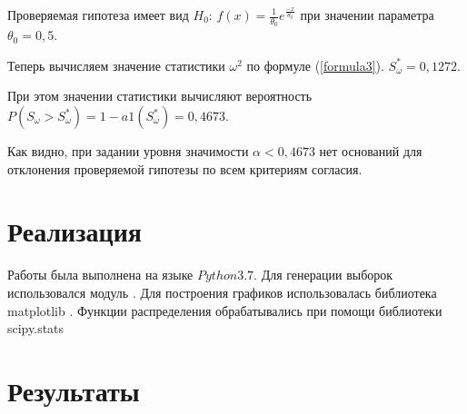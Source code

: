 \documentclass[a4]{article}
\begin{document}
Проверяемая гипотеза имеет вид $H_{0}$: $f(x) = \frac{1}{\theta_{0}}e^\frac{-x}{\theta_{0}}$ при значении параметра $\theta_{0} = 0,5$.

Теперь вычисляем значение статистики $\omega^2$ по формуле (\ref{formula3}). $S^*_{\omega} = 0,1272$.

При этом значении статистики вычисляют вероятность $P \left(S_{\omega} > S^*_{\omega}\right) = 1 - a1(S^*_{\omega} ) = 0,4673$.

Как видно, при задании уровня значимости $\alpha < 0,4673$  нет оснований для отклонения проверяемой гипотезы по всем критериям согласия.

\section{Реализация}
Работы была выполнена на языке $Python 3.7.$
Для генерации выборок использовался модуль \cite{numpy}.
Для построения графиков использовалась библиотека matplotlib \cite{plotlib}.
Функции распределения обрабатывались при помощи библиотеки scipy.stats \cite{skp}

\section{Результаты}
\end{document}
